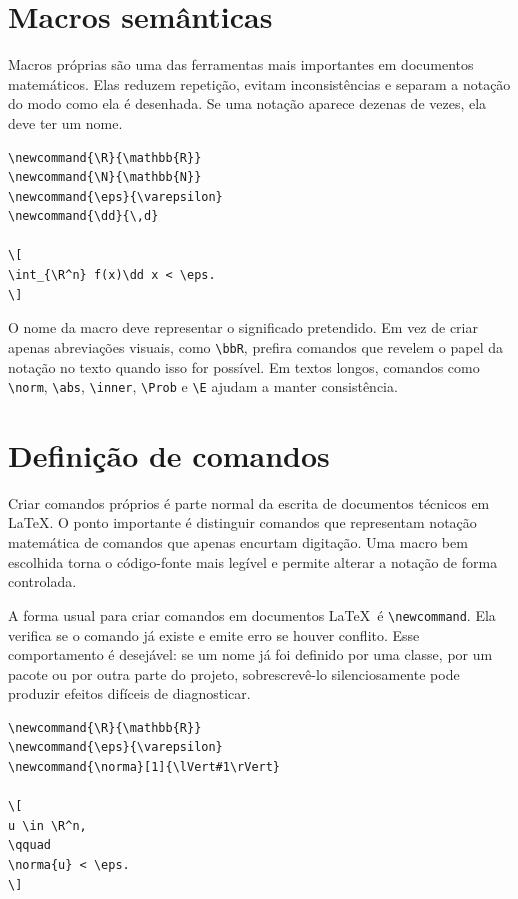 \section{Macros semânticas}

Macros próprias são uma das ferramentas mais importantes em documentos matemáticos. Elas reduzem repetição, evitam inconsistências e separam a notação do modo como ela é desenhada. Se uma notação aparece dezenas de vezes, ela deve ter um nome.

\begin{lstlisting}[language={[latex]TeX}, caption={Macros para notação recorrente}]
\newcommand{\R}{\mathbb{R}}
\newcommand{\N}{\mathbb{N}}
\newcommand{\eps}{\varepsilon}
\newcommand{\dd}{\,d}

\[
\int_{\R^n} f(x)\dd x < \eps.
\]
\end{lstlisting}

O nome da macro deve representar o significado pretendido. Em vez de criar apenas abreviações visuais, como \verb|\bbR|, prefira comandos que revelem o papel da notação no texto quando isso for possível. Em textos longos, comandos como \verb|\norm|, \verb|\abs|, \verb|\inner|, \verb|\Prob| e \verb|\E| ajudam a manter consistência.

\section{Definição de comandos}

Criar comandos próprios é parte normal da escrita de documentos técnicos em \LaTeX. O ponto importante é distinguir comandos que representam notação matemática de comandos que apenas encurtam digitação. Uma macro bem escolhida torna o código-fonte mais legível e permite alterar a notação de forma controlada.

A forma usual para criar comandos em documentos \LaTeX\ é \verb|\newcommand|. Ela verifica se o comando já existe e emite erro se houver conflito. Esse comportamento é desejável: se um nome já foi definido por uma classe, por um pacote ou por outra parte do projeto, sobrescrevê-lo silenciosamente pode produzir efeitos difíceis de diagnosticar.

\begin{lstlisting}[language={[latex]TeX}, caption={Definição segura de comandos}]
\newcommand{\R}{\mathbb{R}}
\newcommand{\eps}{\varepsilon}
\newcommand{\norma}[1]{\lVert#1\rVert}

\[
u \in \R^n,
\qquad
\norma{u} < \eps.
\]
\end{lstlisting}

